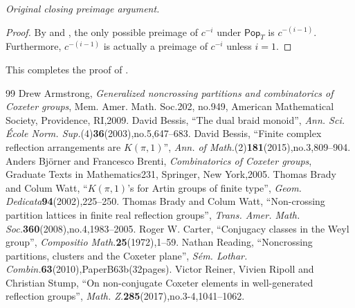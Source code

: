 \documentclass[10pt,a4paper]{amsart}
\theoremstyle{definition}
\newcommand{\pop}{\mathsf{Pop}}
\begin{document}
\noindent\textit{Original closing preimage argument.}
\begin{proof}
  By  and , the only possible preimage of $c^{-i}$ under $\pop_T$ is $c^{-(i-1)}$.  Furthermore, $c^{-(i-1)}$ is actually a preimage of $c^{-i}$ unless $i=1$.
\end{proof}

This completes the proof of .

\begin{thebibliography}{99}
 Drew Armstrong, \emph{Generalized noncrossing partitions and combinatorics of Coxeter groups}, Mem. Amer. Math. Soc.202, no.949, American Mathematical Society, Providence, RI,2009.
 David Bessis, ``The dual braid monoid'', \emph{Ann. Sci. \'Ecole Norm. Sup.}(4)\textbf{36}(2003),no.5,647--683.
 David Bessis, ``Finite complex reflection arrangements are $K(\pi,1)$'', \emph{Ann. of Math.}(2)\textbf{181}(2015),no.3,809--904.
 Anders Bj\"orner and Francesco Brenti, \emph{Combinatorics of Coxeter groups}, Graduate Texts in Mathematics231, Springer, New York,2005.
 Thomas Brady and Colum Watt, ``$K(\pi,1)$'s for Artin groups of finite type'', \emph{Geom. Dedicata}\textbf{94}(2002),225--250.
 Thomas Brady and Colum Watt, ``Non-crossing partition lattices in finite real reflection groups'', \emph{Trans. Amer. Math. Soc.}\textbf{360}(2008),no.4,1983--2005.
 Roger W. Carter, ``Conjugacy classes in the Weyl group'', \emph{Compositio Math.}\textbf{25}(1972),1--59.
 Nathan Reading, ``Noncrossing partitions, clusters and the Coxeter plane'', \emph{S\'em. Lothar. Combin.}\textbf{63}(2010),PaperB63b(32pages).
 Victor Reiner, Vivien Ripoll and Christian Stump, ``On non-conjugate Coxeter elements in well-generated reflection groups'', \emph{Math. Z.}\textbf{285}(2017),no.3-4,1041--1062.
\end{thebibliography}
\end{document}
